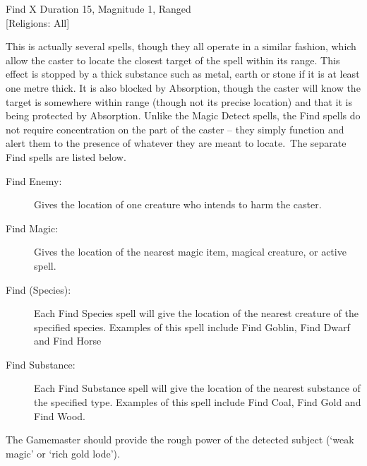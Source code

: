 \begin{samepage}
\begin{rpg-spell}
{Find X}
{Duration 15, Magnitude 1, Ranged\\{[Religions: All]}}

This is actually several spells, though they all operate in a similar fashion, which allow the caster to locate the closest target of the spell within its range. This effect is stopped by a thick substance such as metal, earth or stone if it is at least one metre thick. It is also blocked by Absorption, though the caster will know the target is somewhere within range (though not its precise location) and that it is being protected by Absorption. Unlike the Magic Detect spells, the Find spells do not require concentration on the part of the caster – they simply function and alert them to the presence of whatever they are meant to locate. The separate Find spells are listed below. 
\begin{description}
\item[Find Enemy:] Gives the location of one creature who intends to harm the caster. 
\item[Find Magic:] Gives the location of the nearest magic item, magical creature, or active spell. 
\item[Find (Species):] Each Find Species spell will give the location of the nearest creature of the specified species. Examples of this spell include Find Goblin, Find Dwarf and Find Horse
\item[Find Substance:] Each Find Substance spell will give the location of the nearest substance of the specified type. Examples of this spell include Find Coal, Find Gold and Find Wood. 
\end{description}
The Gamemaster should provide the rough power of the detected subject (‘weak magic’ or ‘rich gold lode’). 
\end{rpg-spell}
\end{samepage}

